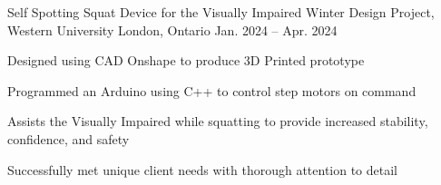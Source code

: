 

\begin{cventries}

  \cventry
    {Self Spotting Squat Device for the Visually Impaired} %
    {Winter Design Project, Western University} %
    {London, Ontario} %
    {Jan. 2024 -- Apr. 2024} %
    {
      \begin{cvitems} %
        \item {Designed using CAD Onshape to produce 3D Printed prototype}
        \item {Programmed an Arduino using C++ to control step motors on command}
        \item {Assists the Visually Impaired while squatting to provide increased stability, confidence, and safety}
        \item {Successfully met unique client needs with thorough attention to detail}
      \end{cvitems}
    }


\end{cventries}
